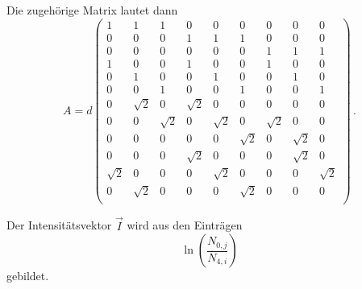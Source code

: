 Die zugehörige Matrix lautet dann
\begin{equation}
  A= d
  \left(
  \begin{array}{rrrrrrrrr}
    1 & 1 & 1 & 0 & 0 & 0 & 0 & 0 & 0 \\
    0 & 0 & 0 & 1 & 1 & 1 & 0 & 0 & 0 \\
    0 & 0 & 0 & 0 & 0 & 0 & 1 & 1 & 1 \\
    1 & 0 & 0 & 1 & 0 & 0 & 1 & 0 & 0 \\
    0 & 1 & 0 & 0 & 1 & 0 & 0 & 1 & 0 \\
    0 & 0 & 1 & 0 & 0 & 1 & 0 & 0 & 1 \\
    0 & \sqrt{2} & 0 & \sqrt{2} & 0 & 0 & 0 & 0 & 0 \\
    0 & 0 & \sqrt{2} & 0 & \sqrt{2} & 0 & \sqrt{2} & 0 & 0 \\
    0 & 0 & 0 & 0 & 0 & \sqrt{2} & 0 & \sqrt{2} & 0 \\
    0 & 0 & 0 & \sqrt{2} & 0 & 0 & 0 & \sqrt{2} & 0 \\
    \sqrt{2} & 0 & 0 & 0 & \sqrt{2} & 0 & 0 & 0 & \sqrt{2} \\
    0 & \sqrt{2} & 0 & 0 & 0 & \sqrt{2} & 0 & 0 & 0 \\
  \end{array}
  \right)\,.
\end{equation}

Der Intensitätsvektor $\vec{I}$ wird aus den Einträgen
\begin{equation*}
  \ln\left(\frac{N_{0,j}}{N_{4,i}}\right)
\end{equation*}
gebildet.

